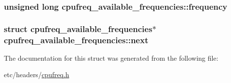 \subsubsection[{\texorpdfstring{frequency}{frequency}}]{\setlength{\rightskip}{0pt plus 5cm}unsigned long cpufreq\+\_\+available\+\_\+frequencies\+::frequency}\hypertarget{structcpufreq__available__frequencies_a1e1de232844a2267ce9eda63bc48fa15}{}\label{structcpufreq__available__frequencies_a1e1de232844a2267ce9eda63bc48fa15}
\subsubsection[{\texorpdfstring{next}{next}}]{\setlength{\rightskip}{0pt plus 5cm}struct {\bf cpufreq\+\_\+available\+\_\+frequencies}$\ast$ cpufreq\+\_\+available\+\_\+frequencies\+::next}\hypertarget{structcpufreq__available__frequencies_a1357e659ef6f3c8aa486dceb796ad3c2}{}\label{structcpufreq__available__frequencies_a1357e659ef6f3c8aa486dceb796ad3c2}


The documentation for this struct was generated from the following file\+:\begin{DoxyCompactItemize}
\item 
etc/headers/\hyperlink{cpufreq_8h}{cpufreq.\+h}\end{DoxyCompactItemize}
